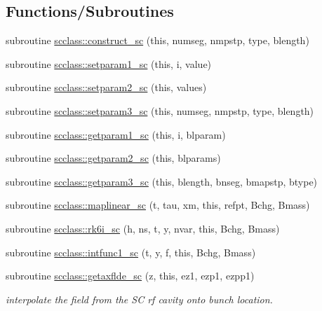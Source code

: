\subsection*{Functions/\+Subroutines}
\begin{DoxyCompactItemize}
\item 
subroutine \mbox{\hyperlink{namespacescclass_a117b083b5a5a59d050fe5c0a4771332b}{scclass\+::construct\+\_\+sc}} (this, numseg, nmpstp, type, blength)
\item 
subroutine \mbox{\hyperlink{namespacescclass_a23a57a64ee6a74149bbc9cf009ce8711}{scclass\+::setparam1\+\_\+sc}} (this, i, value)
\item 
subroutine \mbox{\hyperlink{namespacescclass_af35b79ac06dc2b6bec2d97f6e745ab20}{scclass\+::setparam2\+\_\+sc}} (this, values)
\item 
subroutine \mbox{\hyperlink{namespacescclass_a656d4cc4d5fe872ffa9df12bab721bec}{scclass\+::setparam3\+\_\+sc}} (this, numseg, nmpstp, type, blength)
\item 
subroutine \mbox{\hyperlink{namespacescclass_a5f02207aa4bb28b292bf39bd5876c7e2}{scclass\+::getparam1\+\_\+sc}} (this, i, blparam)
\item 
subroutine \mbox{\hyperlink{namespacescclass_a036860e8ca9dff4cc79e19ec6c55f86a}{scclass\+::getparam2\+\_\+sc}} (this, blparams)
\item 
subroutine \mbox{\hyperlink{namespacescclass_aaa829fed79c7f89ac09b012687895817}{scclass\+::getparam3\+\_\+sc}} (this, blength, bnseg, bmapstp, btype)
\item 
subroutine \mbox{\hyperlink{namespacescclass_aec786348c1a0beec0d090c12b13d588c}{scclass\+::maplinear\+\_\+sc}} (t, tau, xm, this, refpt, Bchg, Bmass)
\item 
subroutine \mbox{\hyperlink{namespacescclass_a4b16987e1d3852123c69a6bfc0cec75a}{scclass\+::rk6i\+\_\+sc}} (h, ns, t, y, nvar, this, Bchg, Bmass)
\item 
subroutine \mbox{\hyperlink{namespacescclass_a5d354b33de72df0b6be68290744f94ba}{scclass\+::intfunc1\+\_\+sc}} (t, y, f, this, Bchg, Bmass)
\item 
subroutine \mbox{\hyperlink{namespacescclass_aefc9ea62cf36830e2c74869fff2f1b17}{scclass\+::getaxflde\+\_\+sc}} (z, this, ez1, ezp1, ezpp1)
\begin{DoxyCompactList}\small\item\em interpolate the field from the SC rf cavity onto bunch location. \end{DoxyCompactList}\item 

\end{DoxyCompactItemize}
